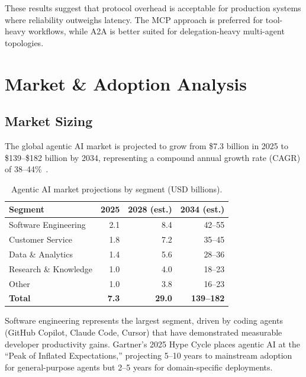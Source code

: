 \documentclass[12pt, a4paper]{article}
\begin{document}
These results suggest that protocol overhead is acceptable for production systems where reliability outweighs latency. The MCP approach is preferred for tool-heavy workflows, while A2A is better suited for delegation-heavy multi-agent topologies.

\section{Market \& Adoption Analysis}\label{sec:market}

\subsection{Market Sizing}
The global agentic AI market is projected to grow from \$7.3 billion in 2025 to \$139--\$182 billion by 2034, representing a compound annual growth rate (CAGR) of 38--44\%~\citep{grandview2025agentic}.

\begin{table}[ht]
\centering
\caption{Agentic AI market projections by segment (USD billions).}
\label{tab:market}
\begin{tabular}{lrrr}
\toprule
\textbf{Segment} & \textbf{2025} & \textbf{2028 (est.)} & \textbf{2034 (est.)} \\
\midrule
Software Engineering    & 2.1  & 8.4   & 42--55 \\
Customer Service        & 1.8  & 7.2   & 35--45 \\
Data \& Analytics       & 1.4  & 5.6   & 28--36 \\
Research \& Knowledge   & 1.0  & 4.0   & 18--23 \\
Other                   & 1.0  & 3.8   & 16--23 \\
\midrule
\textbf{Total}          & \textbf{7.3} & \textbf{29.0} & \textbf{139--182} \\
\bottomrule
\end{tabular}
\end{table}

Software engineering represents the largest segment, driven by coding agents (GitHub Copilot, Claude Code, Cursor) that have demonstrated measurable developer productivity gains. Gartner's 2025 Hype Cycle places agentic AI at the ``Peak of Inflated Expectations,'' projecting 5--10 years to mainstream adoption for general-purpose agents but 2--5 years for domain-specific deployments.
\end{document}
